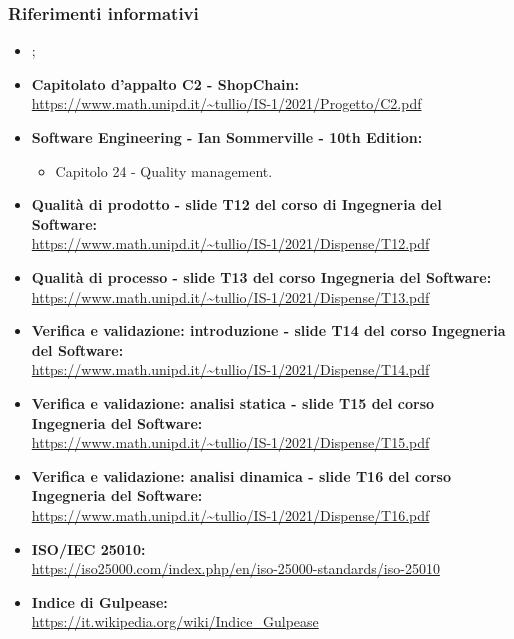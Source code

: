 \subsubsection{Riferimenti informativi}\label{subsubsection:riferimenti_informativi}
\begin{itemize}
  \item \textbf{\docNameVersionAdR{}};
  \item \textbf{Capitolato d'appalto C2 - ShopChain:}\\\url{https://www.math.unipd.it/~tullio/IS-1/2021/Progetto/C2.pdf}
  \item \textbf{Software Engineering - Ian Sommerville - 10th Edition:}
  \begin{itemize}
    \item Capitolo 24 - Quality management.
  \end{itemize}
  \item \textbf{Qualità di prodotto - slide T12 del corso di Ingegneria del Software:}\\\url{https://www.math.unipd.it/~tullio/IS-1/2021/Dispense/T12.pdf}
  \item \textbf{Qualità di processo - slide T13 del corso Ingegneria del Software:}\\\url{https://www.math.unipd.it/~tullio/IS-1/2021/Dispense/T13.pdf}
  \item \textbf{Verifica e validazione: introduzione - slide T14 del corso Ingegneria del Software:}\\\url{https://www.math.unipd.it/~tullio/IS-1/2021/Dispense/T14.pdf}
  \item \textbf{Verifica e validazione: analisi statica - slide T15 del corso Ingegneria del Software:}\\\url{https://www.math.unipd.it/~tullio/IS-1/2021/Dispense/T15.pdf}
  \item \textbf{Verifica e validazione: analisi dinamica - slide T16 del corso Ingegneria del Software:}\\\url{https://www.math.unipd.it/~tullio/IS-1/2021/Dispense/T16.pdf}
  \item \textbf{ISO/IEC 25010:}\\\url{https://iso25000.com/index.php/en/iso-25000-standards/iso-25010}
  \item \textbf{Indice di Gulpease:}\\\url{https://it.wikipedia.org/wiki/Indice_Gulpease}
\end{itemize}